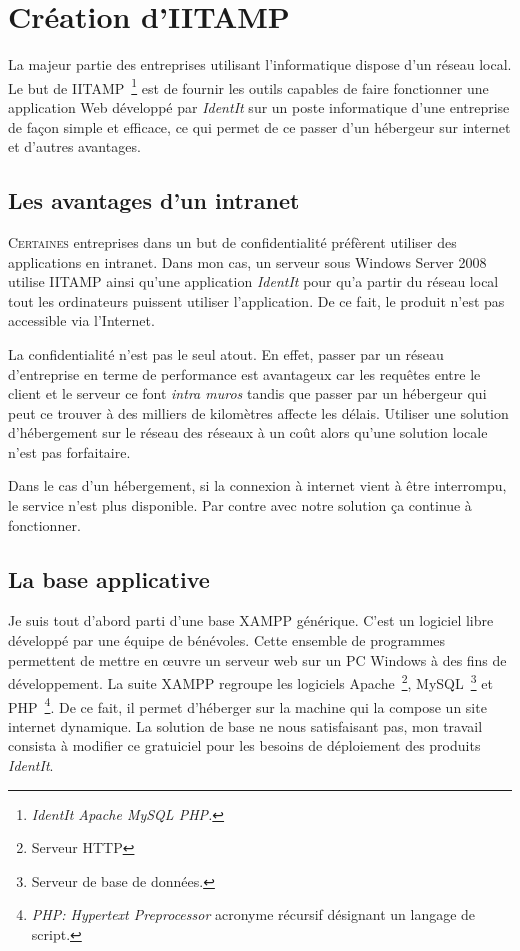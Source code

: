\chapter{Création d'IITAMP} %
\label{cha:Création d'IITAMP}

\begin{it}
  La majeur partie des entreprises utilisant l'informatique
  dispose d'un réseau local. Le but de IITAMP\, \footnote{\emph{IdentIt
  Apache MySQL PHP.}} est de fournir les outils capables de faire
  fonctionner une application Web développé par \emph{IdentIt} sur un
  poste informatique d'une entreprise de façon simple et efficace, ce
  qui permet de ce passer d'un hébergeur sur internet et d'autres
  avantages.
\end{it}

\section{Les avantages d'un intranet} %
\label{sec:Les avantages d'un intranet}

\lettrine{C}{ertaines} entreprises dans un but de confidentialité
préfèrent utiliser des applications en intranet. Dans mon cas, un
serveur sous Windows Server 2008 utilise IITAMP ainsi
qu'une application \emph{IdentIt} pour qu'a partir du réseau local tout
les ordinateurs puissent utiliser l'application. De ce fait, le produit
n'est pas accessible via l'Internet.

La confidentialité n'est pas le seul atout. En effet, passer par un
réseau d'entreprise en terme de performance est avantageux car les
requêtes entre le client et le serveur ce font \emph{intra muros} tandis
que passer par un hébergeur qui peut ce trouver à des milliers de
kilomètres affecte les délais. Utiliser une solution d'hébergement sur
le réseau des réseaux à un coût alors qu'une solution locale n'est pas
forfaitaire.

Dans le cas d'un hébergement, si la connexion à internet vient à être
interrompu, le service n'est plus disponible. Par contre avec notre
solution ça continue à fonctionner.

\section{La base applicative} %
\label{sec:La base applicative}

Je suis tout d'abord parti d'une base XAMPP générique. C'est un logiciel
libre développé par une équipe de bénévoles. Cette ensemble de
programmes permettent de mettre en \oe{}uvre un serveur web sur un PC
Windows à des fins de développement. La suite XAMPP regroupe les
logiciels Apache\, \footnote{Serveur HTTP}, MySQL\, \footnote{Serveur de
base de données.} et PHP\, \footnote{\emph{PHP: Hypertext Preprocessor}
acronyme récursif désignant un langage de script.}. De ce fait, il
permet d'héberger sur la machine qui la compose un site internet
dynamique. La solution de base ne nous satisfaisant pas, mon travail
consista à modifier ce gratuiciel pour les besoins de déploiement des
produits \emph{IdentIt}.

